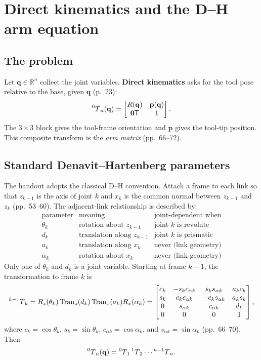 \documentclass[11pt,a4paper]{article}
\newcommand{\R}{\mathbb{R}}
\newcommand{\trans}{\mathsf{T}}
\newcommand{\Tran}{\operatorname{Tran}}
\begin{document}
\section{Direct kinematics and the D--H arm equation}

\subsection{The problem}

Let $\mathbf q\in\R^n$ collect the joint variables. \textbf{Direct kinematics} asks for the tool pose relative to the base, given $\mathbf q$ (p.~23):
\[
  \prescript{0}{}{T}_{n}(\mathbf q)=
  \begin{bmatrix}R(\mathbf q)&\mathbf p(\mathbf q)\\\mathbf0\trans&1\end{bmatrix}.
\]
The $3\times3$ block gives the tool-frame orientation and $\mathbf p$ gives the tool-tip position. This composite transform is the \emph{arm matrix} (pp.~66--72).

\subsection{Standard Denavit--Hartenberg parameters}

The handout adopts the classical D--H convention. Attach a frame to each link so that $z_{k-1}$ is the axis of joint $k$ and $x_k$ is the common normal between $z_{k-1}$ and $z_k$ (pp.~53--60). The adjacent-link relationship is described by:
\[
\begin{array}{c|c|c}
\text{parameter} & \text{meaning} & \text{joint-dependent when}\\ \hline
\theta_k & \text{rotation about }z_{k-1} & \text{joint }k\text{ is revolute}\\
d_k & \text{translation along }z_{k-1} & \text{joint }k\text{ is prismatic}\\
a_k & \text{translation along }x_k & \text{never (link geometry)}\\
\alpha_k & \text{rotation about }x_k & \text{never (link geometry)}
\end{array}
\]
Only one of $\theta_k$ and $d_k$ is a joint variable. Starting at frame $k-1$, the transformation to frame $k$ is
\[
  \prescript{k-1}{}{T}_{k}
  =R_z(\theta_k)\Tran_z(d_k)\Tran_x(a_k)R_x(\alpha_k)
  =\begin{bmatrix}
  c_k&-s_kc_{\alpha k}&s_ks_{\alpha k}&a_kc_k\\
  s_k& c_kc_{\alpha k}&-c_ks_{\alpha k}&a_ks_k\\
  0&s_{\alpha k}&c_{\alpha k}&d_k\\
  0&0&0&1
  \end{bmatrix},
\]
where $c_k=\cos\theta_k$, $s_k=\sin\theta_k$, $c_{\alpha k}=\cos\alpha_k$, and $s_{\alpha k}=\sin\alpha_k$ (pp.~66--70). Then
\[
  \prescript{0}{}{T}_{n}(\mathbf q)=
  \prescript{0}{}{T}_{1}\prescript{1}{}{T}_{2}\cdots\prescript{n-1}{}{T}_{n}.
\]
\end{document}
